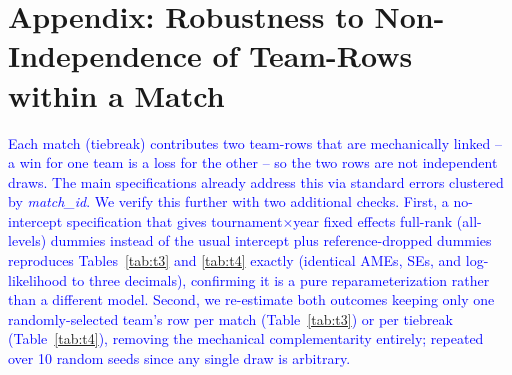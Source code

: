 \documentclass[10pt]{article}
\begin{document}
\section{Appendix: Robustness to Non-Independence of Team-Rows within a Match}
\textcolor{blue}{Each match (tiebreak) contributes two team-rows that are mechanically linked -- a win for one team is a loss for the other -- so the two rows are not independent draws. The main specifications already address this via standard errors clustered by \textit{match\_id}. We verify this further with two additional checks. First, a no-intercept specification that gives tournament$\times$year fixed effects full-rank (all-levels) dummies instead of the usual intercept plus reference-dropped dummies reproduces Tables~\ref{tab:t3} and \ref{tab:t4} exactly (identical AMEs, SEs, and log-likelihood to three decimals), confirming it is a pure reparameterization rather than a different model. Second, we re-estimate both outcomes keeping only one randomly-selected team's row per match (Table~\ref{tab:t3}) or per tiebreak (Table~\ref{tab:t4}), removing the mechanical complementarity entirely; repeated over 10 random seeds since any single draw is arbitrary.}
\end{document}

